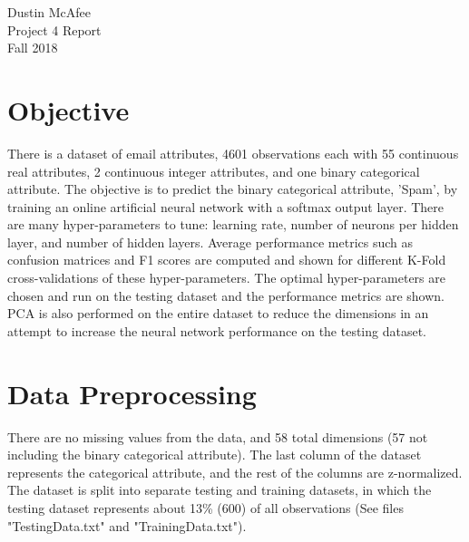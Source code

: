 \documentclass[tikz]{article}
\begin{document}
\begin{center}
Dustin McAfee \\
Project 4 Report \\
Fall 2018 \\
\end{center}

\singlespacing

\section{Objective}
\label{sec:obj}
There is a dataset of email attributes, 4601 observations each with 55 continuous real attributes, 2 continuous integer attributes, and one binary categorical attribute. The objective is to predict the binary categorical attribute, 'Spam', by training an online artificial neural network with a softmax output layer. There are many hyper-parameters to tune: learning rate, number of neurons per hidden layer, and number of hidden layers. Average performance metrics such as confusion matrices and F1 scores are computed and shown for different K-Fold cross-validations of these hyper-parameters. The optimal hyper-parameters are chosen and run on the testing dataset and the performance metrics are shown. PCA is also performed on the entire dataset to reduce the dimensions in an attempt to increase the neural network performance on the testing dataset. 

\section{Data Preprocessing}
\label{sec:preprocessing}
There are no missing values from the data, and 58 total dimensions (57 not including the binary categorical attribute). The last column of the dataset represents the categorical attribute, and the rest of the columns are z-normalized. The dataset is split into separate testing and training datasets, in which the testing dataset represents about 13\% (600) of all observations (See files "TestingData.txt" and "TrainingData.txt").
\end{document}
